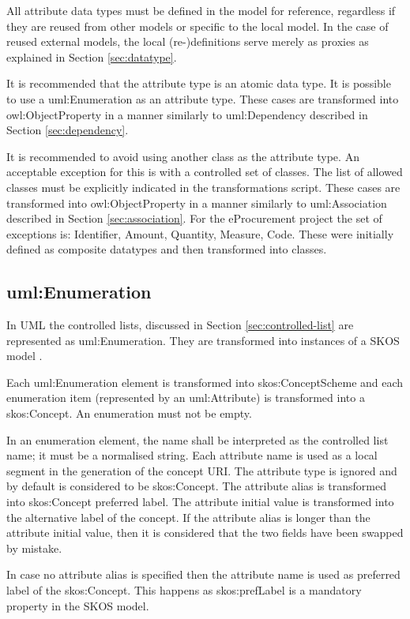 	All attribute data types must be defined in the model for reference, regardless if they are reused from other models or specific to the local model. In the case of reused external models, the local (re-)definitions serve merely as proxies as explained in Section \ref{sec:datatype}.
	
	It is recommended that the attribute type is an atomic data type. 
	It is possible to use a uml:Enumeration as an attribute type. These cases are transformed into owl:ObjectProperty in a manner similarly to uml:Dependency described in Section \ref{sec:dependency}. 
	
	It is recommended to avoid using another class as the attribute type. An acceptable exception for this is with a controlled set of classes. The list of allowed classes must be explicitly indicated in the transformations script. These cases are transformed into owl:ObjectProperty in a manner similarly to uml:Association described in Section \ref{sec:association}. For the eProcurement project the set of exceptions is: Identifier, Amount, Quantity, Measure, Code. These were initially defined as composite datatypes and then transformed into classes. 
	
	\subsection{uml:Enumeration}
	\label{sec:enumeration}

	In UML the controlled lists, discussed in Section \ref{sec:controlled-list} are represented as uml:Enumeration. They are transformed into instances of a SKOS model \cite{skos-spec}. 
	
	Each uml:Enumeration element is transformed into skos:ConceptScheme and each enumeration item (represented by an uml:Attribute) is transformed into a skos:Concept. An enumeration must not be empty.
	
	In an enumeration element, the name shall be interpreted as the controlled list name; it must be a normalised string. Each attribute name is used as a local segment in the generation of the concept URI. The attribute type is ignored and by default is considered to be skos:Concept. The attribute alias is transformed into skos:Concept preferred label. The attribute initial value is transformed into the alternative label of the concept. If the attribute alias is longer than the attribute initial value, then it is considered that the two fields have been swapped by mistake. 
	
	In case no attribute alias is specified then the attribute name is used as preferred label of the skos:Concept. This happens as skos:prefLabel is a mandatory property in the SKOS model.
	
